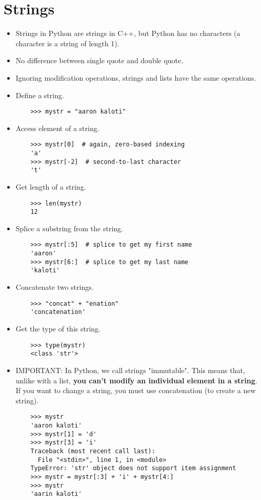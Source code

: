 \documentclass{article}
\begin{document}
\section{Strings}
\begin{itemize}
    \item Strings in Python are strings in C++, but Python has no characters (a character is a string of length 1).
    \item No difference between single quote and double quote.
    \item Ignoring modification operations, strings and lists have the same operations.
    \item Define a string.
    \begin{lstlisting}
    >>> mystr = "aaron kaloti"
    \end{lstlisting}
    \item Access element of a string.
    \begin{lstlisting}
    >>> mystr[0]  # again, zero-based indexing
    'a'
    >>> mystr[-2]  # second-to-last character
    't'
    \end{lstlisting}
    \item Get length of a string.
    \begin{lstlisting}
    >>> len(mystr)
    12
    \end{lstlisting}
    \item Splice a substring from the string.
    \begin{lstlisting}
    >>> mystr[:5]  # splice to get my first name
    'aaron'
    >>> mystr[6:]  # splice to get my last name
    'kaloti'
    \end{lstlisting}
    \item Concatenate two strings.
    \begin{lstlisting}
    >>> "concat" + "enation"
    'concatenation'
    \end{lstlisting}
    \item Get the type of this string.
    \begin{lstlisting}
    >>> type(mystr)
    <class 'str'>
    \end{lstlisting}
    \item IMPORTANT: In Python, we call strings "immutable". This means that, unlike with a list, \textbf{you can't modify an individual element in a string}. If you want to change a string, you must use concatenation (to create a new string).
    \begin{lstlisting}
    >>> mystr
    'aaron kaloti'
    >>> mystr[1] = 'd'
    >>> mystr[3] = 'i' 
    Traceback (most recent call last):
      File "<stdin>", line 1, in <module>
    TypeError: 'str' object does not support item assignment
    >>> mystr = mystr[:3] + 'i' + mystr[4:]
    >>> mystr
    'aarin kaloti'
    \end{lstlisting}
\end{itemize}
\end{document}
